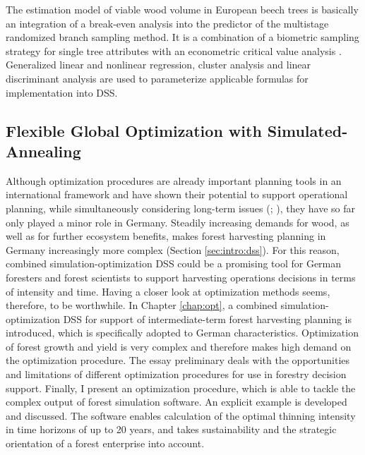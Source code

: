 The estimation model of viable wood volume in European beech trees is basically an integration of a break-even analysis into the predictor of the multistage randomized branch sampling method. It is a combination of a biometric sampling strategy for single tree attributes \citep[p. 405]{Gregoire_2008} with an econometric critical value analysis \citep[p. 46]{mushoff_2013}. Generalized linear and nonlinear regression, cluster analysis and linear discriminant analysis are used to parameterize applicable formulas for implementation into DSS.

\subsection{Flexible Global Optimization with Simulated-Annealing}
\label{subsec:intro:struct:opt}
Although optimization procedures are already important planning tools in an international framework \citep[p. 1]{hoganson_2015} and have shown their potential to support operational planning, while simultaneously considering long-term issues (\citealp[p. 1]{hoganson_2015}; \citealp[p. 1081]{pretzsch_2008}), they have so far only played a minor role in Germany. Steadily increasing demands for wood, as well as for further ecosystem benefits, makes forest harvesting planning in Germany increasingly more complex (Section \ref{sec:intro:dss}). For this reason, combined si\-mu\-la\-tion-op\-ti\-mi\-za\-tion DSS could be a promising tool for German foresters and forest scientists to support harvesting operations decisions in terms of intensity and time. Having a closer look at optimization methods seems, therefore, to be worthwhile. In Chapter \ref{chap:opt}, a combined si\-mu\-la\-tion-op\-ti\-mi\-za\-tion DSS for support of intermediate-term forest harvesting planning is introduced, which is specifically adopted to German characteristics. Optimization of forest growth and yield is very complex and therefore makes high demand on the optimization procedure. The essay preliminary deals with the opportunities and limitations of different optimization procedures for use in forestry decision support. Finally, I present an optimization procedure, which is able to tackle the complex output of forest simulation software. An explicit example is developed and discussed. The software enables calculation of the optimal thinning intensity in time horizons of up to 20 years, and takes sustainability and the strategic orientation of a forest enterprise into account.


